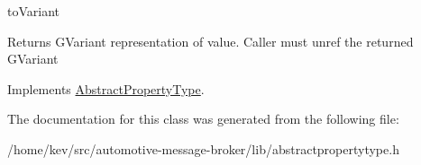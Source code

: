 to\+Variant 

\begin{DoxyReturn}{Returns}
G\+Variant representation of value. Caller must unref the returned G\+Variant 
\end{DoxyReturn}


Implements \hyperlink{classAbstractPropertyType_ae4c8025e310eb06916a28e0341f3356d}{Abstract\+Property\+Type}.



The documentation for this class was generated from the following file\+:\begin{DoxyCompactItemize}
\item 
/home/kev/src/automotive-\/message-\/broker/lib/abstractpropertytype.\+h\end{DoxyCompactItemize}
